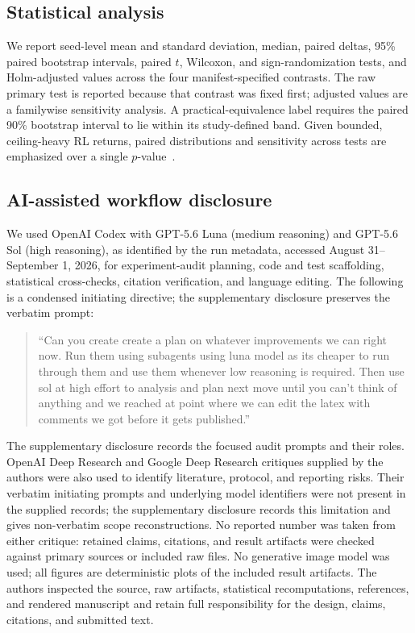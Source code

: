 \documentclass[runningheads]{llncs}
\begin{document}
\subsection{Statistical analysis}

We report seed-level mean and standard deviation, median, paired deltas, 95\%
paired bootstrap intervals, paired $t$, Wilcoxon, and sign-randomization tests,
and Holm-adjusted values across the four manifest-specified contrasts. The raw primary
test is reported because that contrast was fixed first; adjusted values are a
familywise sensitivity analysis. A practical-equivalence label requires the
paired 90\% bootstrap interval to lie within its study-defined band. Given
bounded, ceiling-heavy RL returns, paired distributions and sensitivity across
tests are emphasized over a single $p$-value~\cite{agarwal2021precipice}.

\subsection{AI-assisted workflow disclosure}

We used OpenAI Codex with GPT-5.6 Luna (medium reasoning) and GPT-5.6 Sol
(high reasoning), as identified by the run metadata, accessed August
31--September 1, 2026, for experiment-audit
planning, code and test scaffolding, statistical cross-checks, citation
verification, and language editing. The following is a condensed initiating
directive; the supplementary disclosure preserves the verbatim prompt:
\begin{quote}\small
``Can you create create a plan on whatever improvements we can right now. Run
them using subagents using luna model as its cheaper to run through them and use
them whenever low reasoning is required. Then use sol at high effort to analysis
and plan next move until you can't think of anything and we reached at point
where we can edit the latex with comments we got before it gets published.''
\end{quote}
The supplementary disclosure records the focused audit prompts and their roles.
OpenAI Deep Research and Google Deep Research critiques supplied by the authors
were also used to identify literature, protocol, and reporting risks. Their
verbatim initiating prompts and underlying model identifiers were not present
in the supplied records; the supplementary disclosure records this limitation
and gives non-verbatim scope reconstructions. No reported number was taken from
either critique: retained claims, citations, and result artifacts were checked
against primary sources or included raw files.
No generative image model was used; all figures are deterministic plots of the
included result artifacts. The authors inspected the source, raw artifacts,
statistical recomputations, references, and rendered manuscript and retain full
responsibility for the design, claims, citations, and submitted text.
\end{document}

